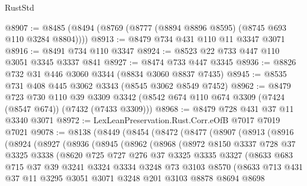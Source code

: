 \begin{lexlean}{RustStd}
\begin{coremodule}
{\begin{coremodule}
{{{{{{{{{{{{{{{{{{{{{{{{{{{{{{{{@8907 := @8485 (@8494 (@8769 (@8777 (@8894 @8896 @8595) (@8745 @693 @110 @3284 @8804))))
@8913 := @8479 @734 @431 @110 @11 @3347 @3071
@8916 := @8491 @734 @110 @3347
@8924 := @8523 @22 @733 @447 @110 @3051 @3345 @3337 @841
@8927 := @8474 @733 @447 @3345
@8936 := @8826 @732 @31 @446 @3060 @3344 (@8834 @3060 @8837 @7435)
@8945 := @8535 @731 @408 @445 @3062 @3343 (@8545 @3062 @8549 @7452)
@8962 := @8479
    @723
    @730
    @110
    @39
    @3309
    @3342
    (@8542 @674 @110 @674 @3309 (@7424 (@8547 @674)) (@7432 (@7433 @3309)))
@8968 := @8479 @728 @431 @37 @11 @3340 @3071
@8972 := LexLeanPreservation.Rust.Corr.eOfB @7017 @7019 @7021
@9078 := @8138
    (@8449
      (@8454
        (@8472
          (@8477
            (@8907
              (@8913
                (@8916
                  (@8924
                    (@8927
                      (@8936
                        (@8945
                          (@8962
                            (@8968
                              (@8972
                                @8150
                                @3337
                                @728
                                @37
                                @3325
                                @3338
                                (@8620
                                  @725
                                  @727
                                  @276
                                  @37
                                  @3325
                                  @3335
                                  @3327
                                  (@8633
                                    @683
                                    @715
                                    @37
                                    @39
                                    @3241
                                    @3324
                                    @3334
                                    @3248
                                    @73
                                    @3103
                                    @8570
                                    (@8633
                                      @713
                                      @431
                                      @37
                                      @11
                                      @3295
                                      @3051
                                      @3071
                                      @3248
                                      @201
                                      @3103
                                      @8878
                                      @8694
                                      @8698
}}}}}}}}}}}}}}}}}}}}}}}}}}}}}}}}
\end{coremodule}}
\end{coremodule}
\end{lexlean}
